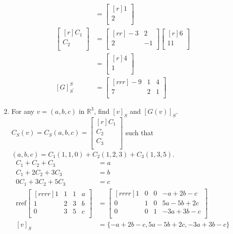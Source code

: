\documentclass[12pt]{article}
\theoremstyle{definition}
\theoremstyle{plain}
\begin{document}
\begin{enumerate}
\begin{enumerate}
\begin{align*}
		&=\begin{bmatrix}[r]1\\2\\\end{bmatrix}\\
		\begin{bmatrix}[r]C_1\\C_2\\\end{bmatrix}&=\begin{bmatrix}[rr]-3&2\\2&-1\\\end{bmatrix}\begin{bmatrix}[r]6\\11\\\end{bmatrix}\\
		&=\begin{bmatrix}[r]4\\1\\\end{bmatrix}\\
		[G]_{S^\prime}^S&=\begin{bmatrix}[rrr]-9&1&4\\7&2&1\\\end{bmatrix}
		\end{align*}
	\item For any $v=(a,b,c)$ in $\mathbb{R}^3$, find $[v]_S$ and $[G(v)]_S$.\\
		$C_S(v)=C_S(a,b,c)=\begin{bmatrix}[r]C_1\\C_2\\C_3\\\end{bmatrix}$ such that $(a,b,c)=C_1(1,1,0)+C_2(1,2,3)+C_3(1,3,5)$.
		\begin{align*}
		C_1+C_2+C_3 &= a\\
		C_1+2C_2+3C_3 &=b\\
		0C_1+3C_2+5C_3&=c\\
		\mathrm{rref}\begin{bmatrix}[rrrr]1&1&1&a\\1&2&3&b\\0&3&5&c\\\end{bmatrix} &= \begin{bmatrix}[rrrr]1&0&0&-a+2b-c\\0&1&0&5a-5b+2c\\0&0&1&-3a+3b-c\\\end{bmatrix}\\
		[v]_S&=\{-a+2b-c,5a-5b+2c,-3a+3b-c\}
		\end{align*}
		

\end{enumerate}
\end{enumerate}
\end{document}
